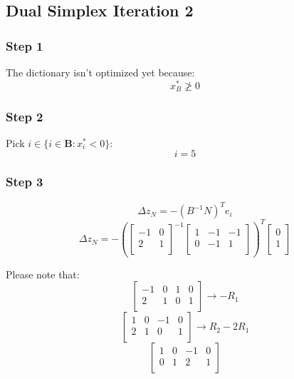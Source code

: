 \documentclass[14pt]{extarticle}
\begin{document}
\subsection*{Dual Simplex Iteration 2}
\subsubsection*{Step 1}
The dictionary isn't optimized yet because:
\[
    x^*_B \ngeq 0
\]

\subsubsection*{Step 2}
Pick $i \in \{i \in \boldsymbol{B}: x^*_i < 0\}$:
\[
    i = 5
\]

\subsubsection*{Step 3}
\[
    \Delta z_N = -(B^{-1}N)^T e_i
\]
\[
    \Delta z_N = -\left(\begin{bmatrix}
        -1 & 0 \\
        2 & 1 \\
    \end{bmatrix}^{-1}
    \begin{bmatrix}
        1 & -1 & -1 \\
        0 & -1 & 1 \\
    \end{bmatrix}\right)^T
    \begin{bmatrix}
        0 \\
        1 \\
    \end{bmatrix}
\]

\bigskip Please note that:
\[
    \left[
    \begin{array}{cc|cc}
        -1 & 0 & 1 & 0 \\
        2 & 1 & 0 & 1 \\
    \end{array}
    \right] \to -R_1
\]
\[
    \left[
    \begin{array}{cc|cc}
        1 & 0 & -1 & 0 \\
        2 & 1 & 0 & 1 \\
    \end{array}
    \right] \to R_2 - 2R_1
\]
\[
    \left[
    \begin{array}{cc|cc}
        1 & 0 & -1 & 0 \\
        0 & 1 & 2 & 1 \\
    \end{array}
    \right]
\]
\end{document}
